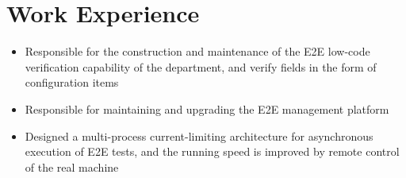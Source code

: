 \documentclass{resume}
\newcommand{\en}[1]{#1}
\newcommand{\zh}[1]{}
\begin{document}
\section{\en{Work Experience}\zh{工作经历}}
\en{}
\zh{\datedsubsection{\textbf{\href{https://www.bytedance.com/}{百度}}}{2022/05 -- 2022/09}}
\en{}
\zh{\role{百度搜索产品}{Rust 研发实习}}
\begin{itemize}
      \item \en{Responsible for the construction and maintenance of the E2E low-code verification capability of the department, and verify fields in the form of configuration items}
            \zh{负责本部门E2E低代码校验能力的构建与维护，采用配置项的形式校验字段}
      \item \en{Responsible for maintaining and upgrading the E2E management platform}
            \zh{负责维护升级E2E相关管理平台}
      \item \en{Designed a multi-process current-limiting architecture for asynchronous execution of E2E tests, and the running speed is improved by remote control of the real machine}
            \zh{设计了多进程限流架构用于异步执行E2E测试，通过远程调控真机提升运行速度}
\end{itemize}
\end{document}
